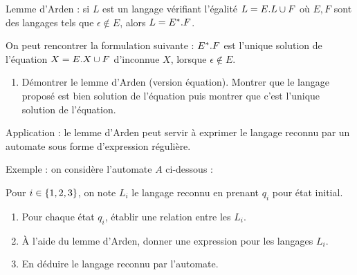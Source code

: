 \begin{exo}
Lemme d'Arden : si \(L\) est un langage vérifiant l'égalité \(L=E.L\cup F\) où \(E,F\) sont des langages tels que \(\epsilon\not\in E\), alors \(L=E^{*}.F\).

On peut rencontrer la formulation suivante : \(E^{*}.F\) est l'unique solution de l'équation \(X=E.X\cup F\) d'inconnue \(X\), lorsque \(\epsilon\not\in E\).

\begin{enumerate}[series=ex2.8]
    \item Démontrer le lemme d'Arden (version équation). Montrer que le langage proposé est bien solution de l'équation puis montrer que c'est l'unique solution de l'équation.
\end{enumerate}

Application : le lemme d'Arden peut servir à exprimer le langage reconnu par un automate sous forme d'expression régulière.

Exemple : on considère l'automate \(A\) ci-dessous :

\begin{center}
\end{center}

Pour \(i\in\left\lbrace1,2,3\right\rbrace\), on note \(L_i\) le langage reconnu en prenant \(q_i\) pour état initial.

\begin{enumerate}[resume=ex2.8]
    \item Pour chaque état \(q_i\), établir une relation entre les \(L_i\). \\
    \item À l'aide du lemme d'Arden, donner une expression pour les langages \(L_i\). \\
    \item En déduire le langage reconnu par l'automate.
\end{enumerate}
\end{exo}


